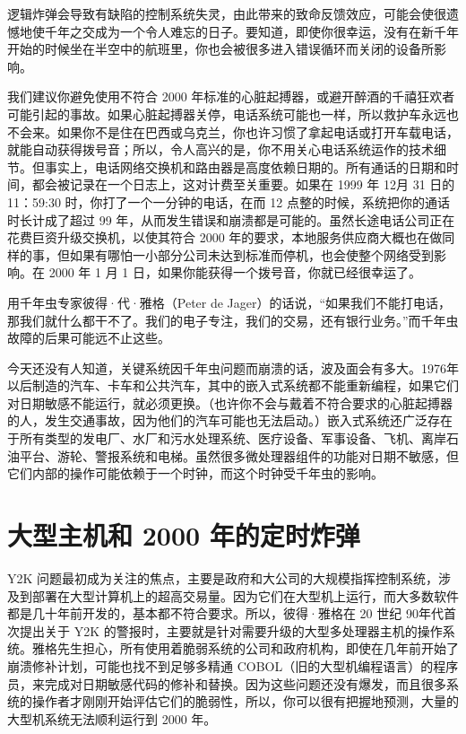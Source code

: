 逻辑炸弹会导致有缺陷的控制系统失灵，由此带来的致命反馈效应，可能会使很遗憾地使千年之交成为一个令人难忘的日子。要知道，即使你很幸运，没有在新千年开始的时候坐在半空中的航班里，你也会被很多进入错误循环而关闭的设备所影响。


我们建议你避免使用不符合 2000 年标准的心脏起搏器，或避开醉酒的千禧狂欢者可能引起的事故。如果心脏起搏器关停，电话系统可能也一样，所以救护车永远也不会来。如果你不是住在巴西或乌克兰，你也许习惯了拿起电话或打开车载电话，就能自动获得拨号音；所以，令人高兴的是，你不用关心电话系统运作的技术细节。但事实上，电话网络交换机和路由器是高度依赖日期的。所有通话的日期和时间，都会被记录在一个日志上，这对计费至关重要。如果在 1999 年 12月 31 日的 11：59:30 时，你打了一个一分钟的电话，在而 12 点整的时候，系统把你的通话时长计成了超过 99 年，从而发生错误和崩溃都是可能的。虽然长途电话公司正在花费巨资升级交换机，以使其符合 2000 年的要求，本地服务供应商大概也在做同样的事，但如果有哪怕一小部分公司未达到标准而停机，也会使整个网络受到影响。在 2000 年 1 月 1 日，如果你能获得一个拨号音，你就已经很幸运了。


用千年虫专家彼得·代·雅格（Peter de Jager）的话说，“如果我们不能打电话，那我们就什么都干不了。我们的电子专注，我们的交易，还有银行业务。”而千年虫故障的后果可能远不止这些。


今天还没有人知道，关键系统因千年虫问题而崩溃的话，波及面会有多大。1976年以后制造的汽车、卡车和公共汽车，其中的嵌入式系统都不能重新编程，如果它们对日期敏感不能运行，就必须更换。（也许你不会与戴着不符合要求的心脏起搏器的人，发生交通事故，因为他们的汽车可能也无法启动。）嵌入式系统还广泛存在于所有类型的发电厂、水厂和污水处理系统、医疗设备、军事设备、飞机、离岸石油平台、游轮、警报系统和电梯。虽然很多微处理器组件的功能对日期不敏感，但它们内部的操作可能依赖于一个时钟，而这个时钟受千年虫的影响。


\section{大型主机和 2000 年的定时炸弹}
Y2K 问题最初成为关注的焦点，主要是政府和大公司的大规模指挥控制系统，涉及到部署在大型计算机上的超高交易量。因为它们在大型机上运行，而大多数软件都是几十年前开发的，基本都不符合要求。所以，彼得·雅格在 20 世纪 90年代首次提出关于 Y2K 的警报时，主要就是针对需要升级的大型多处理器主机的操作系统。雅格先生担心，所有使用着脆弱系统的公司和政府机构，即使在几年前开始了崩溃修补计划，可能也找不到足够多精通 COBOL（旧的大型机编程语言）的程序员，来完成对日期敏感代码的修补和替换。因为这些问题还没有爆发，而且很多系统的操作者才刚刚开始评估它们的脆弱性，所以，你可以很有把握地预测，大量的大型机系统无法顺利运行到 2000 年。


